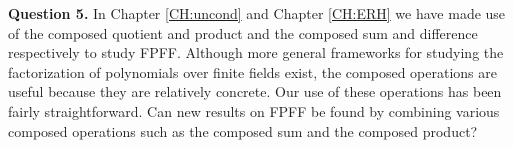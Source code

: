 \documentclass{article}
\theoremstyle{plain}
\theoremstyle{definition}
\begin{document}
		\textbf{Question 5.} In Chapter \ref{CH:uncond} and Chapter \ref{CH:ERH} we have made use of the composed quotient and product and the composed sum and difference respectively to study FPFF. Although more general frameworks for studying the factorization of polynomials over finite fields exist, the composed operations are useful because they are relatively concrete. Our use of these operations has been fairly straightforward. Can new results on FPFF be found by combining various composed operations such as the composed sum and the composed product?

%
%
\nocite{Cipolla}		
\nocite{pocklington1917}
\newpage		



\end{document}
